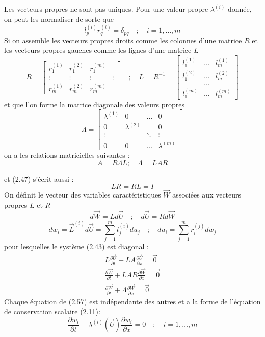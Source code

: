 Les vecteurs propres ne sont pas uniques. Pour une valeur propre $\lambda^{(i)}$ donnée, on peut les normaliser de sorte que
$$
l_{p}^{(i)} r_{q}^{(i)}=\delta_{p q} \quad ; \quad i=1, \ldots, m
$$
Si on assemble les vecteurs propres droits comme les colonnes d'une matrice $R$ et les vecteurs propres gauches comme les lignes d'une matrice $L$
$$
R=\left[\begin{array}{cccc}
r_{1}^{(1)} & r_{1}^{(2)} & r_{1}^{(m)} \\
\vdots & \vdots & \vdots & \vdots \\
r_{m}^{(1)} & r_{m}^{(2)} & r_{m}^{(m)}
\end{array}\right] \quad ; \quad L=R^{-1}=\left[\begin{array}{ccc}
l_{1}^{(1)} & \ldots & l_{m}^{(1)} \\
l_{1}^{(2)} & \ldots & l_{m}^{(2)} \\
& \ldots & \\
l_{1}^{(m)} & \ldots & l_{m}^{(m)}
\end{array}\right]
$$
et que l'on forme la matrice diagonale des valeurs propres
$$
\Lambda=\left[\begin{array}{cccc}
\lambda^{(1)} & 0 & \ldots & 0 \\
0 & \lambda^{(2)} & & 0 \\
\vdots & & \ddots & \vdots \\
0 & 0 & \ldots & \lambda^{(m)}
\end{array}\right]
$$
on a les relations matricielles suivantes :
$$ A=R \Lambda L; \quad \Lambda=LAR$$

et (2.47) s'écrit aussi :
$$L R=R L=I$$
On définit le vecteur des variables caractéristiques $\vec{W}$ associées aux vecteurs propres $L$ et $R$
$$
d \vec{W}=L d \vec{U} \quad ; \quad d \vec{U}=R d \vec{W}
$$
$$
d w_{i}=\vec{L}^{(i)} d \vec{U}=\sum_{j=1}^{m} l_{j}^{(i)} d u_{j} \quad ; \quad d u_{i}=\sum_{j=1}^{m} r_{i}^{(j)} d w_{j}
$$
pour lesquelles le système (2.43) est diagonal :
$$
\begin{array}{l}
L \frac{\partial \vec{U}}{\partial t}+L A \frac{\partial \vec{U}}{\partial x}=\overrightarrow{0} \\
\frac{\partial \vec{W}}{\partial t}+L A R \frac{\partial \vec{W}}{\partial x}=\overrightarrow{0} \\
\frac{\partial \vec{W}}{\partial t}+\Lambda \frac{\partial \vec{W}}{\partial x}=\overrightarrow{0}
\end{array}
$$
Chaque équation de (2.57) est indépendante des autres et a la forme de l'équation de conservation scalaire (2.11):
$$
\frac{\partial w_{i}}{\partial t}+\lambda^{(i)}(\vec{U}) \frac{\partial w_{i}}{\partial x}=0 \quad ; \quad i=1, \ldots, m
$$

